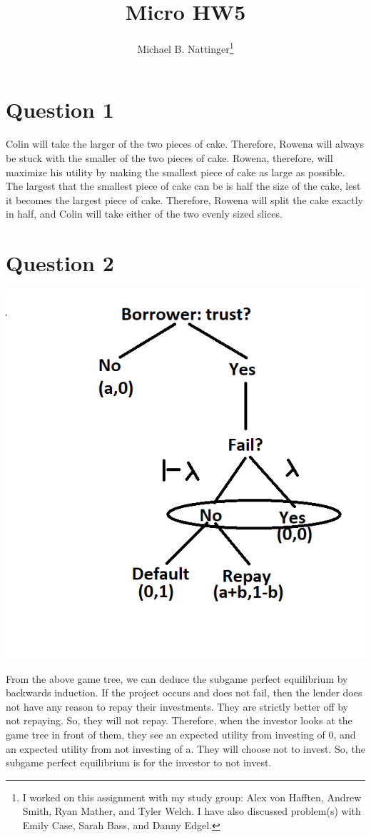 \documentclass[11pt]{article} %
\title{Micro HW5}
\author{Michael B. Nattinger\footnote{I worked on this assignment with my study group: Alex von Hafften, Andrew Smith, Ryan Mather, and Tyler Welch. I have also discussed problem(s) with Emily Case, Sarah Bass, and Danny Edgel.}}
\begin{document}
\maketitle

\section{Question 1}
Colin will take the larger of the two pieces of cake. Therefore, Rowena will always be stuck with the smaller of the two pieces of cake. Rowena, therefore, will maximize his utility by making the smallest piece of cake as large as possible. The largest that the smallest piece of cake can be is half the size of the cake, lest it becomes the largest piece of cake. Therefore, Rowena will split the cake exactly in half, and Colin will take either of the two evenly sized slices.

\section{Question 2}
\includegraphics{extform}

From the above game tree, we can deduce the subgame perfect equilibrium by backwards induction. If the project occurs and does not fail, then the lender does not have any reason to repay their investments. They are strictly better off by not repaying. So, they will not repay. Therefore, when the investor looks at the game tree in front of them, they see an expected utility from investing of 0, and an expected utility from not investing of a. They will choose not to invest. So, the subgame perfect equilibrium is for the investor to not invest.
\end{document}
